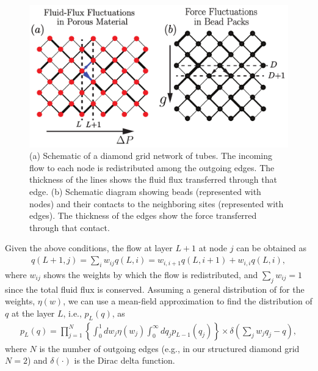 \documentclass[%
 amsmath,amssymb,
prstper,
]{revtex4-2}
\begin{document}
\begin{figure}[h]
  \centering
  \includegraphics[width=.75\textwidth]{FigS1.pdf} %
  \caption{(a) Schematic of a  diamond grid network of tubes. The incoming flow to each node is redistributed among the outgoing edges. The thickness of the lines shows the fluid flux transferred through that edge. (b) Schematic diagram showing beads (represented with nodes) and their contacts to the neighboring sites (represented with edges). The thickness of the edges show the force transferred through that contact.} \label{grid-result}
\end{figure}
%
Given the above conditions, the flow at layer $L+1$ at node $j$ can be obtained as 
%
\begin{align}
  q(L+1,j) = \sum_i w_{ij} q(L,i) = w_{i,i+1} q(L,i+1) + w_{i,i} q(L,i), \label{total-flow}
\end{align}
%
where $w_{ij}$ shows the weights by which the flow is redistributed, and $\sum_{j} w_{ij} = 1$ since the total fluid flux is conserved. 
%
%
Assuming a general distribution of for the weights, $\eta(w)$, we can use a mean-field approximation to find the distribution of $q$ at the layer $L$, i.e., $p_L(q)$, as 
%
\begin{align}
  p_L (q) = \prod_{j=1}^N \left\{ \int_0^1 d w_j \eta(w_j) \int_0^{\infty} dq_j p_{L-1}(q_j)\right\} \times \delta \left( \sum_j w_j q_{j} - q \right),
\end{align}
%
where $N$ is the number of outgoing edges (e.g., in our structured diamond grid $N=2$) and $\delta(\cdot)$ is the Dirac delta function. 
\end{document}
